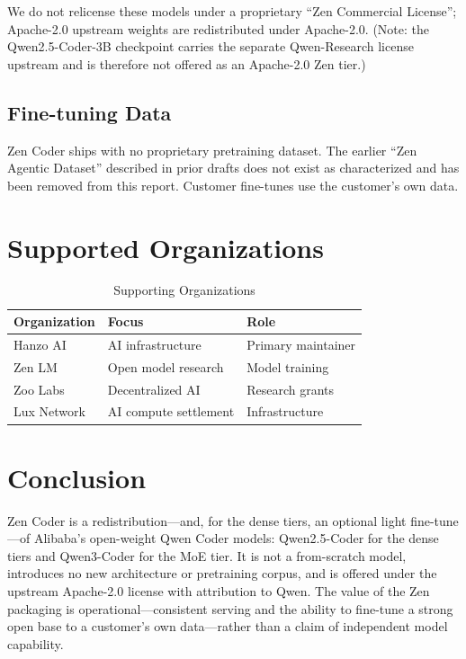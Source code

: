 \documentclass[11pt,a4paper]{article}
\begin{document}
\noindent We do not relicense these models under a proprietary ``Zen Commercial License''; Apache-2.0
upstream weights are redistributed under Apache-2.0. (Note: the Qwen2.5-Coder-3B checkpoint carries the
separate Qwen-Research license upstream and is therefore not offered as an Apache-2.0 Zen tier.)

\subsection{Fine-tuning Data}
Zen Coder ships with no proprietary pretraining dataset. The earlier ``Zen Agentic Dataset'' described
in prior drafts does not exist as characterized and has been removed from this report. Customer
fine-tunes use the customer's own data.

\section{Supported Organizations}

\begin{table}[H]
\centering
\begin{tabular}{lll}
\toprule
\textbf{Organization} & \textbf{Focus} & \textbf{Role} \\
\midrule
Hanzo AI & AI infrastructure & Primary maintainer \\
Zen LM & Open model research & Model training \\
Zoo Labs & Decentralized AI & Research grants \\
Lux Network & AI compute settlement & Infrastructure \\
\bottomrule
\end{tabular}
\caption{Supporting Organizations}
\end{table}

\section{Conclusion}

Zen Coder is a redistribution---and, for the dense tiers, an optional light fine-tune---of Alibaba's
open-weight Qwen Coder models: Qwen2.5-Coder \cite{qwen25coder} for the dense tiers and Qwen3-Coder
\cite{qwen3coder} for the MoE tier. It is not a from-scratch model, introduces no new architecture or
pretraining corpus, and is offered under the upstream Apache-2.0 license with attribution to Qwen. The
value of the Zen packaging is operational---consistent serving and the ability to fine-tune a strong
open base to a customer's own data---rather than a claim of independent model capability.
\end{document}
